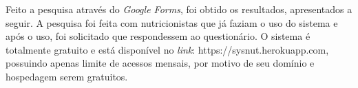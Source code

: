 Feito a pesquisa através do \textit{Google Forms}, foi obtido os resultados, apresentados a seguir. A pesquisa foi feita com nutricionistas que já faziam o uso do sistema e após o uso, foi solicitado que respondessem ao questionário. O sistema é totalmente gratuito e está disponível no \textit{link}: https://sysnut.herokuapp.com, possuindo apenas limite de acessos mensais, por motivo de seu domínio e hospedagem serem gratuitos.

